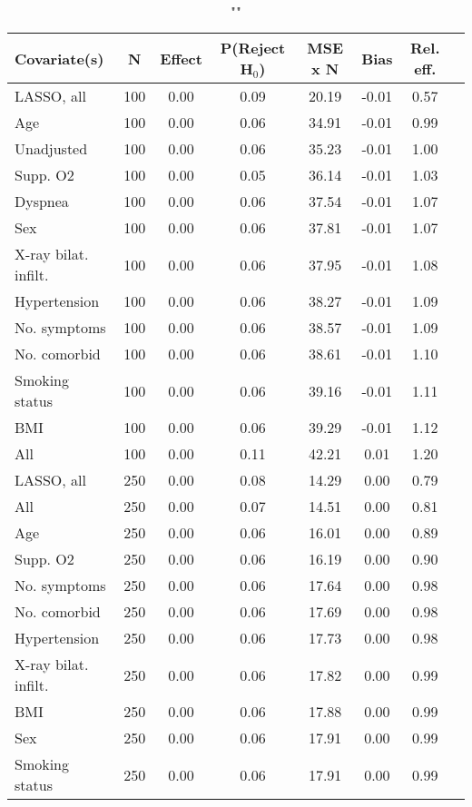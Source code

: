 \documentclass{article}
\begin{document}
{\tabcolsep=6pt  %
\begin{longtable}{lccccccc}
\caption{""} \\
Covariate(s) & N & Effect & P(Reject H$_0$) & MSE x N & Bias & Rel. eff.\\ \midrule
LASSO, all & 100 & 0.00 & 0.09 & 20.19 & -0.01 & 0.57 \\ 
Age & 100 & 0.00 & 0.06 & 34.91 & -0.01 & 0.99 \\ 
Unadjusted & 100 & 0.00 & 0.06 & 35.23 & -0.01 & 1.00 \\ 
Supp. O2 & 100 & 0.00 & 0.05 & 36.14 & -0.01 & 1.03 \\ 
Dyspnea & 100 & 0.00 & 0.06 & 37.54 & -0.01 & 1.07 \\ 
Sex & 100 & 0.00 & 0.06 & 37.81 & -0.01 & 1.07 \\ 
X-ray bilat. infilt. & 100 & 0.00 & 0.06 & 37.95 & -0.01 & 1.08 \\ 
Hypertension & 100 & 0.00 & 0.06 & 38.27 & -0.01 & 1.09 \\ 
No. symptoms & 100 & 0.00 & 0.06 & 38.57 & -0.01 & 1.09 \\ 
No. comorbid & 100 & 0.00 & 0.06 & 38.61 & -0.01 & 1.10 \\ 
Smoking status & 100 & 0.00 & 0.06 & 39.16 & -0.01 & 1.11 \\ 
BMI & 100 & 0.00 & 0.06 & 39.29 & -0.01 & 1.12 \\ 
All & 100 & 0.00 & 0.11 & 42.21 &  0.01 & 1.20 \\ \midrule 
LASSO, all & 250 & 0.00 & 0.08 & 14.29 &  0.00 & 0.79 \\ 
All & 250 & 0.00 & 0.07 & 14.51 &  0.00 & 0.81 \\ 
Age & 250 & 0.00 & 0.06 & 16.01 &  0.00 & 0.89 \\ 
Supp. O2 & 250 & 0.00 & 0.06 & 16.19 &  0.00 & 0.90 \\ 
No. symptoms & 250 & 0.00 & 0.06 & 17.64 &  0.00 & 0.98 \\ 
No. comorbid & 250 & 0.00 & 0.06 & 17.69 &  0.00 & 0.98 \\ 
Hypertension & 250 & 0.00 & 0.06 & 17.73 &  0.00 & 0.98 \\ 
X-ray bilat. infilt. & 250 & 0.00 & 0.06 & 17.82 &  0.00 & 0.99 \\ 
BMI & 250 & 0.00 & 0.06 & 17.88 &  0.00 & 0.99 \\ 
Sex & 250 & 0.00 & 0.06 & 17.91 &  0.00 & 0.99 \\ 
Smoking status & 250 & 0.00 & 0.06 & 17.91 &  0.00 & 0.99 \\ 

\end{longtable}}
\end{document}
